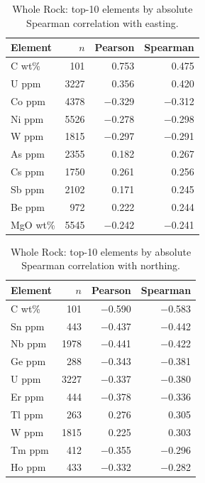 \begin{table}[H]
  \centering
  \caption{Whole Rock: top-10 elements by absolute Spearman correlation with easting.}
  \label{tab:wr-easting}
  \begin{tabular}{lrrr}
    \toprule
    Element & $n$ & Pearson & Spearman \\
    \midrule
    C wt\%   & 101  & 0.753    & 0.475 \\
    U ppm    & 3227 & 0.356    & 0.420 \\
    Co ppm   & 4378 & $-$0.329 & $-$0.312 \\
    Ni ppm   & 5526 & $-$0.278 & $-$0.298 \\
    W ppm    & 1815 & $-$0.297 & $-$0.291 \\
    As ppm   & 2355 & 0.182    & 0.267 \\
    Cs ppm   & 1750 & 0.261    & 0.256 \\
    Sb ppm   & 2102 & 0.171    & 0.245 \\
    Be ppm   & 972  & 0.222    & 0.244 \\
    MgO wt\% & 5545 & $-$0.242 & $-$0.241 \\
    \bottomrule
  \end{tabular}
\end{table}

\begin{table}[H]
  \centering
  \caption{Whole Rock: top-10 elements by absolute Spearman correlation with northing.}
  \label{tab:wr-northing}
  \begin{tabular}{lrrr}
    \toprule
    Element & $n$ & Pearson & Spearman \\
    \midrule
    C wt\% & 101  & $-$0.590 & $-$0.583 \\
    Sn ppm & 443  & $-$0.437 & $-$0.442 \\
    Nb ppm & 1978 & $-$0.441 & $-$0.422 \\
    Ge ppm & 288  & $-$0.343 & $-$0.381 \\
    U ppm  & 3227 & $-$0.337 & $-$0.380 \\
    Er ppm & 444  & $-$0.378 & $-$0.336 \\
    Tl ppm & 263  & 0.276    & 0.305 \\
    W ppm  & 1815 & 0.225    & 0.303 \\
    Tm ppm & 412  & $-$0.355 & $-$0.296 \\
    Ho ppm & 433  & $-$0.332 & $-$0.282 \\
    \bottomrule
  \end{tabular}
\end{table}

